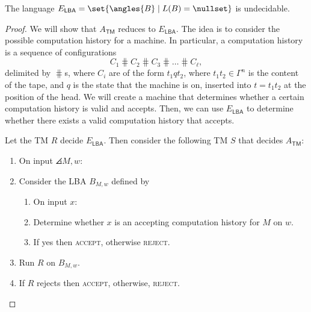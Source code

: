 \documentclass{standalone}
\begin{document}
\begin{proposition}
  The language
  \(E_{\textsf{LBA}} = \set{\angles{B} \mid L(B) = \nullset}\)
  is undecidable.
\end{proposition}
\begin{proof}
  We will show that \(A_{\textsf{TM}}\) reduces to \(E_{\textsf{LBA}}\).
  The idea is to consider the possible computation history for a machine.
  In particular, a computation history is a sequence of configurations
  \[
    C_1 \hash
    C_2 \hash
    C_3 \hash \dots \hash
    C_\ell,
  \]
  delimited by \(\hash\)s, where \(C_i\) are of the form \(t_1 q t_2\),
  where \(t_1 t_2 \in \Gamma^n\) is the content of the tape,
  and \(q\) is the state that the machine is on,
  inserted into \(t = t_1 t_2\) at the position of the head.
  We will create a machine that determines whether
  a certain computation history is valid and accepts.
  Then, we can use \(E_{\textsf{LBA}}\) to determine whether
  there exists a valid computation history that accepts.

  Let the \textsf{TM} \(R\) decide \(E_{\textsf{LBA}}\).
  Then consider the following \textsf{TM} \(S\)
  that decides \(A_{\textsf{TM}}\):
  \begin{enumerate}[nosep, start=0]
    \item On input \(\angles{M, w}\):
  \item Consider the \textsf{LBA} \(B_{M, w}\) defined by
    \begin{enumerate}[nosep]
      \item On input \(x\):
      \item Determine whether \(x\) is
            an accepting computation history for \(M\) on \(w\).
      \item If yes then \textsc{accept}, otherwise \textsc{reject}.
    \end{enumerate}
    \item Run \(R\) on \(B_{M, w}\).
    \item If \(R\) rejects then \textsc{accept},
          otherwise, \textsc{reject}. \pog
  \end{enumerate}
\end{proof}
\end{document}

